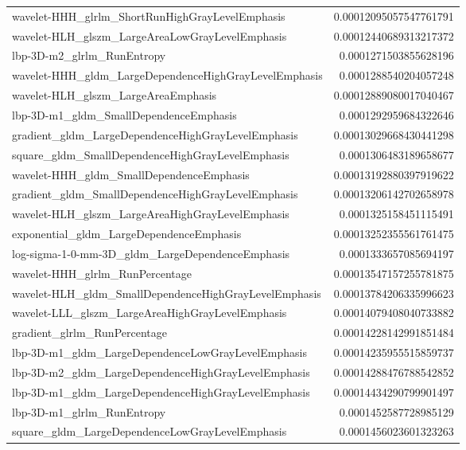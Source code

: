 {\begin{xltabular}[H]{\textwidth}{X r}
        wavelet-HHH\_glrlm\_ShortRunHighGrayLevelEmphasis & 0.00012095057547761791 \\
        wavelet-HLH\_glszm\_LargeAreaLowGrayLevelEmphasis & 0.00012440689313217372 \\
        lbp-3D-m2\_glrlm\_RunEntropy & 0.0001271503855628196 \\
        wavelet-HHH\_gldm\_LargeDependenceHighGrayLevelEmphasis & 0.0001288540204057248 \\
        wavelet-HLH\_glszm\_LargeAreaEmphasis & 0.00012889080017040467 \\
        lbp-3D-m1\_gldm\_SmallDependenceEmphasis & 0.0001292959684322646 \\
        gradient\_gldm\_LargeDependenceHighGrayLevelEmphasis & 0.00013029668430441298 \\
        square\_gldm\_SmallDependenceHighGrayLevelEmphasis & 0.0001306483189658677 \\
        wavelet-HHH\_gldm\_SmallDependenceEmphasis & 0.00013192880397919622 \\
        gradient\_gldm\_SmallDependenceHighGrayLevelEmphasis & 0.00013206142702658978 \\
        wavelet-HLH\_glszm\_LargeAreaHighGrayLevelEmphasis & 0.0001325158451115491 \\
        exponential\_gldm\_LargeDependenceEmphasis & 0.00013252355561761475 \\
        log-sigma-1-0-mm-3D\_gldm\_LargeDependenceEmphasis & 0.0001333657085694197 \\
        wavelet-HHH\_glrlm\_RunPercentage & 0.00013547157255781875 \\
        wavelet-HLH\_gldm\_SmallDependenceHighGrayLevelEmphasis & 0.00013784206335996623 \\
        wavelet-LLL\_glszm\_LargeAreaHighGrayLevelEmphasis & 0.00014079408040733882 \\
        gradient\_glrlm\_RunPercentage & 0.00014228142991851484 \\
        lbp-3D-m1\_gldm\_LargeDependenceLowGrayLevelEmphasis & 0.00014235955515859737 \\
        lbp-3D-m2\_gldm\_LargeDependenceHighGrayLevelEmphasis & 0.00014288476788542852 \\
        lbp-3D-m1\_gldm\_LargeDependenceHighGrayLevelEmphasis & 0.00014434290799901497 \\
        lbp-3D-m1\_glrlm\_RunEntropy & 0.0001452587728985129 \\
        square\_gldm\_LargeDependenceLowGrayLevelEmphasis & 0.0001456023601323263 \\

\end{xltabular}}
